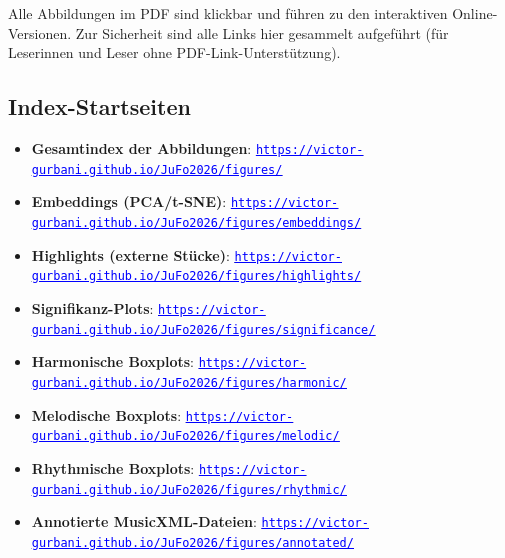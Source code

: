 \documentclass[12pt,a4paper]{article}
\theoremstyle{definition}
\begin{document}
\newcommand{\linkurl}[1]{\href{#1}{\textcolor{blue}{\underline{\nolinkurl{#1}}}}}

Alle Abbildungen im PDF sind klickbar und führen zu den interaktiven Online-Versionen. Zur Sicherheit sind alle Links hier gesammelt aufgeführt (für Leserinnen und Leser ohne PDF-Link-Unterstützung).

\subsection{Index-Startseiten}
\begin{itemize}
    \item \textbf{Gesamtindex der Abbildungen}: \newline\linkurl{https://victor-gurbani.github.io/JuFo2026/figures/}
    \item \textbf{Embeddings (PCA/t-SNE)}: \newline\linkurl{https://victor-gurbani.github.io/JuFo2026/figures/embeddings/}
    \item \textbf{Highlights (externe Stücke)}: \newline\linkurl{https://victor-gurbani.github.io/JuFo2026/figures/highlights/}
    \item \textbf{Signifikanz-Plots}: \newline\linkurl{https://victor-gurbani.github.io/JuFo2026/figures/significance/}
    \item \textbf{Harmonische Boxplots}: \newline\linkurl{https://victor-gurbani.github.io/JuFo2026/figures/harmonic/}
    \item \textbf{Melodische Boxplots}: \newline\linkurl{https://victor-gurbani.github.io/JuFo2026/figures/melodic/}
    \item \textbf{Rhythmische Boxplots}: \newline\linkurl{https://victor-gurbani.github.io/JuFo2026/figures/rhythmic/}
    \item \textbf{Annotierte MusicXML-Dateien}: \newline\linkurl{https://victor-gurbani.github.io/JuFo2026/figures/annotated/}
\end{itemize}
\end{document}

